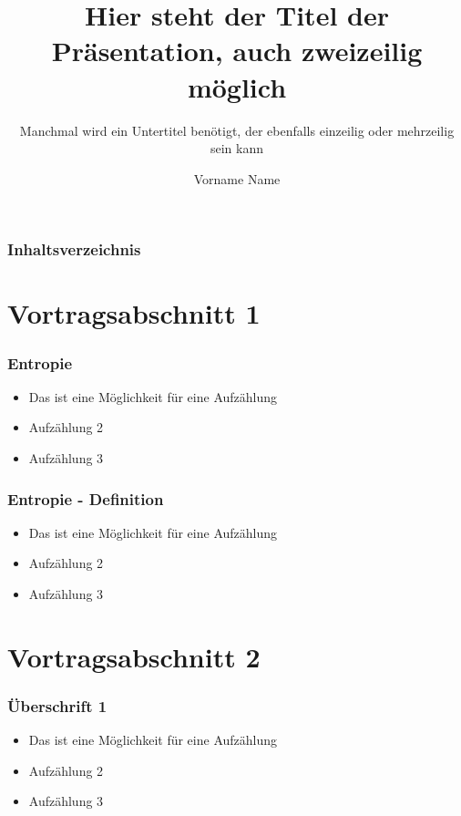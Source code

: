 \documentclass{beamer}
\title{Hier steht der Titel der Pr\"{a}sentation, auch zweizeilig m\"{o}glich}
\subtitle{Manchmal wird ein Untertitel ben\"{o}tigt, der ebenfalls einzeilig oder mehrzeilig sein kann}
\author{Vorname Name}
\institute
{Institut, Einrichtung\\}
\begin{document}
\hspace*{-1.49cm}
\frame[plain]{\titlepage}

\hspace*{-0.7cm}
\begin{frame}
  \frametitle{Inhaltsverzeichnis}
  \tableofcontents
\end{frame}


\section{Vortragsabschnitt 1}
\begin{frame}
  \frametitle{Entropie}
\vspace{-2.6cm}
  \begin{itemize}
    \item Das ist eine M\"{o}glichkeit f\"{u}r eine Aufz\"{a}hlung
    \item Aufz\"{a}hlung 2
    \item Aufz\"{a}hlung 3
  \end{itemize}
\end{frame}

\begin{frame}
  \frametitle{Entropie - Definition}
\vspace{-2.6cm}
  \begin{itemize}
    \item Das ist eine M\"{o}glichkeit f\"{u}r eine Aufz\"{a}hlung
    \item Aufz\"{a}hlung 2
    \item Aufz\"{a}hlung 3
  \end{itemize}
\end{frame}

\section{Vortragsabschnitt 2}
\begin{frame}
  \frametitle{\"{U}berschrift 1}
\vspace{-2.6cm}
  \begin{itemize}
    \item Das ist eine M\"{o}glichkeit f\"{u}r eine Aufz\"{a}hlung
    \item Aufz\"{a}hlung 2
    \item Aufz\"{a}hlung 3
  \end{itemize}
\end{frame}
   
\end{document}
